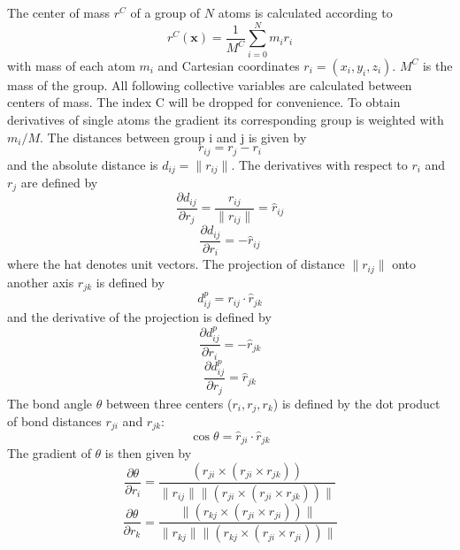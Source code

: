 The center of mass $r^C$ of a group of $N$ atoms is calculated according to
\begin{equation}
  r^C(\textbf{x}) = \frac{1}{M^C} \sum_{i=0}^N m_i r_i
\end{equation}
with mass of each atom $m_i$ and Cartesian coordinates $r_i = (x_i,y_i,z_i)$. $M^C$ is the mass of the group.
All following collective variables are calculated between centers of mass. The index C will be dropped for convenience.
To obtain derivatives of single atoms the gradient its corresponding group is weighted with $m_i/M$.
The distances between group i and j is given by
\begin{equation}
 r_{ij} = r_j - r_i
\end{equation}
and the absolute distance is $d_{ij} = \| r_{ij}\|$.
The derivatives with respect to $r_i$ and $r_j$ are defined by
\begin{equation}
  \frac{\partial d_{ij}}{\partial r_j} = \frac{r_{ij}}{\|r_{ij}\|} = \hat{r}_{ij}
\end{equation}
\begin{equation}
  \frac{\partial d_{ij}}{\partial r_i} = - \hat{r}_{ij}
\end{equation}
where the hat denotes unit vectors.
The projection of distance $\| r_{ij}\|$ onto another axis $r_{jk}$ is defined by
\begin{equation}
  d^p_{ij} = r_{ij} \cdot \hat{r}_{jk}
\end{equation}
and the derivative of the projection is defined by
\begin{equation}
   \frac{\partial d^p_{ij}}{\partial r_i} = -\hat{r}_{jk}
\end{equation}
\begin{equation}
   \frac{\partial d^p_{ij}}{\partial r_j} = \hat{r}_{jk}
\end{equation}
The bond angle $\theta$ between three centers ($r_i, r_j, r_k$) is defined by the dot product of bond distances $r_{ji}$ and $r_{jk}$:
\begin{equation}
  \cos \theta = \hat{r}_{ji} \cdot \hat{r}_{jk}
\end{equation}
The gradient of $\theta$ is then given by
\begin{equation}
  \frac{\partial \theta}{\partial r_i} = \frac{(r_{ji} \times (r_{ji} \times r_{jk})) }{\| r_{ij}\| \| (r_{ji} \times (r_{ji} \times r_{jk})) \|}
\end{equation}
\begin{equation}
  \frac{\partial \theta}{\partial r_k} = \frac{\| (r_{kj} \times (r_{ji} \times r_{ji})) \|}{\| r_{kj}\| \| (r_{kj} \times (r_{ji} \times r_{ji})) \|}
\end{equation}
